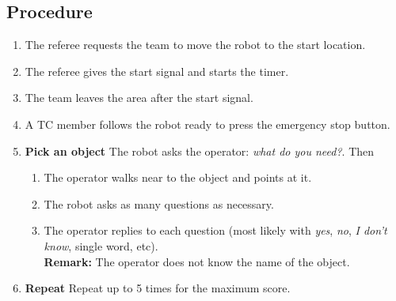 %
%
\subsection*{Procedure}
\begin{enumerate}[nosep]
	\item The referee requests the team to move the robot to the start location.
	\item The referee gives the start signal and starts the timer.
	\item The team leaves the area after the start signal.
	\item A TC member follows the robot ready to press the emergency stop button.
	\item \textbf{Pick an object} The robot asks the operator: \emph{what do you need?}. %
	Then
	\begin{enumerate}[nosep]
		\item The operator walks near to the object and points at it.
		\item The robot asks as many questions as necessary.
		\item The operator replies to each question (most likely with \emph{yes}, \emph{no}, \emph{I don't know}, single word, etc).
		\\\textbf{Remark:} The operator does not know the name of the object.
	\end{enumerate}
  \item \textbf{Repeat} Repeat up to 5 times for the maximum score.
\end{enumerate}


%
%
